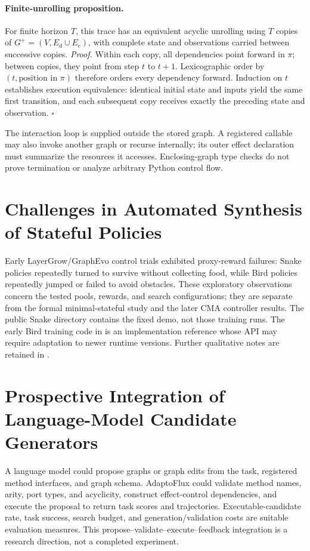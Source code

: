 \paragraph{Finite-unrolling proposition.}
For finite horizon $T$, this trace has an equivalent acyclic unrolling using
$T$ copies of $G^+=(V,E_d\cup E_c)$, with complete state and observations carried
between successive copies.
\emph{Proof.} Within each copy, all dependencies point forward in $\pi$;
between copies, they point from step $t$ to $t+1$. Lexicographic order by
$(t,\text{position in }\pi)$ therefore orders every dependency forward.
Induction on $t$ establishes execution equivalence: identical initial state
and inputs yield the same first transition, and each subsequent copy receives
exactly the preceding state and observation. \hfill$\square$

The interaction loop is supplied outside the stored graph. A registered
callable may also invoke another graph or recurse internally; its outer effect
declaration must summarize the resources it accesses. Enclosing-graph type
checks do not prove termination or analyze arbitrary Python control flow.

\section{Challenges in Automated Synthesis of Stateful Policies}
\label{app:side_effect_experiments}
Early LayerGrow/GraphEvo control trials exhibited proxy-reward failures:
Snake policies repeatedly turned to survive without collecting food, while
Bird policies repeatedly jumped or failed to avoid obstacles. These exploratory
observations concern the tested pools, rewards, and search configurations;
they are separate from the formal minimal-stateful study and the later CMA
controller results. The public Snake directory contains the fixed demo, not
those training runs. The early Bird training code in
 is an implementation reference whose API may
require adaptation to newer runtime versions. Further qualitative notes are
retained in .

\section{Prospective Integration of Language-Model Candidate Generators}
\label{app:llm_candidate_generation}
A language model could propose graphs or graph edits from the task, registered
method interfaces, and graph schema. AdaptoFlux could validate method names,
arity, port types, and acyclicity, construct effect-control dependencies, and
execute the proposal to return task scores and trajectories. Executable-candidate
rate, task success, search budget, and generation/validation costs are suitable
evaluation measures. This propose--validate--execute--feedback integration is
a research direction, not a completed experiment.

